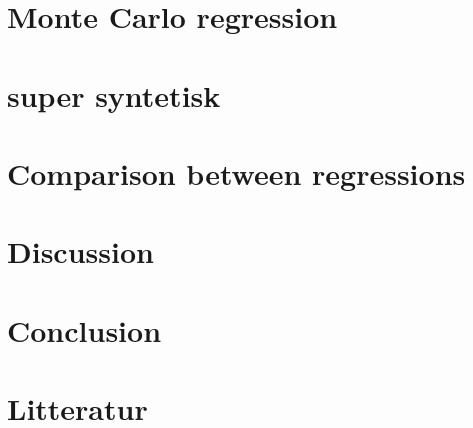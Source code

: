 \documentclass{article}
\begin{document}
	\section{Monte Carlo regression}
	\newpage
	
	
	
	
		\section{super syntetisk}
	
	\newpage
	
	\section{Comparison between regressions}
	\newpage
	
	\section{Discussion}
	\newpage
	
	\section{Conclusion}
	\newpage
	
 	\section{Litteratur}
  
\end{document}
